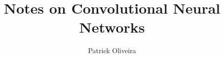 \documentclass{article}
\title{Notes on Convolutional Neural Networks}
\author{Patrick Oliveira}
\affil{}
\begin{document}
\maketitle

\section{}
\end{document}
